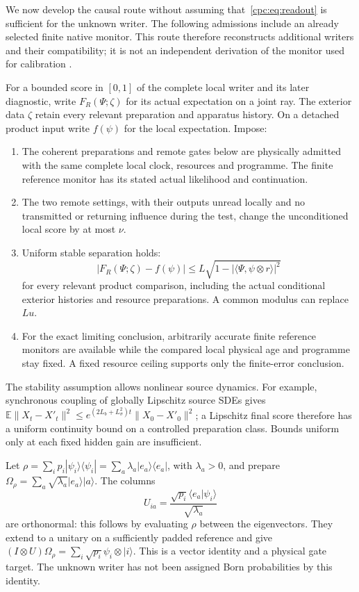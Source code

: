 \documentclass[11pt,oneside,openany]{book}
\theoremstyle{definition}
\theoremstyle{remark}\newtheorem{remark}[theorem]{Remark}
\begin{document}
We now develop the causal route without assuming that~\eqref{cpc:eq:readout} is sufficient for the unknown writer. The following admissions include an already selected finite native monitor. This route therefore reconstructs additional writers and their compatibility; it is not an independent derivation of the monitor used for calibration \cite{M09,M10}.

For a bounded score in $[0,1]$ of the complete local writer and its later diagnostic, write $F_R(\Psi;\zeta)$ for its actual expectation on a joint ray. The exterior data $\zeta$ retain every relevant preparation and apparatus history. On a detached product input write $f(\psi)$ for the local expectation. Impose:
\begin{enumerate}
\item The coherent preparations and remote gates below are physically admitted with the same complete local clock, resources and programme. The finite reference monitor has its stated actual likelihood and continuation.
\item The two remote settings, with their outputs unread locally and no transmitted or returning influence during the test, change the unconditioned local score by at most $\nu$.
\item Uniform stable separation holds:
\begin{equation}
 |F_R(\Psi;\zeta)-f(\psi)|\le L\sqrt{1-|\langle\Psi,\psi\otimes r\rangle|^2}
 \label{cpc:eq:stability}
\end{equation}
for every relevant product comparison, including the actual conditional exterior histories and resource preparations. A common modulus can replace $Lu$.
\item For the exact limiting conclusion, arbitrarily accurate finite reference monitors are available while the compared local physical age and programme stay fixed. A fixed resource ceiling supports only the finite-error conclusion.
\end{enumerate}
The stability assumption allows nonlinear source dynamics. For example, synchronous coupling of globally Lipschitz source SDEs gives
$\mathbb E\|X_t-X'_t\|^2\le e^{(2L_b+L_\sigma^2)t}\|X_0-X'_0\|^2$;
a Lipschitz final score therefore has a uniform continuity bound on a controlled preparation class. Bounds uniform only at each fixed hidden gain are insufficient.

Let $\rho=\sum_i p_i|\psi_i\rangle\langle\psi_i|=\sum_a\lambda_a|e_a\rangle\langle e_a|$, with $\lambda_a>0$, and prepare
$\Omega_\rho=\sum_a\sqrt{\lambda_a}|e_a\rangle|a\rangle$.
The columns
\begin{equation}
 U_{ia}=\frac{\sqrt{p_i}\langle e_a|\psi_i\rangle}{\sqrt{\lambda_a}}
 \label{cpc:eq:ensembleunitary}
\end{equation}
are orthonormal: this follows by evaluating $\rho$ between the eigenvectors. They extend to a unitary on a sufficiently padded reference and give
$(I\otimes U)\Omega_\rho=\sum_i\sqrt{p_i}\psi_i\otimes|i\rangle$.
This is a vector identity and a physical gate target. The unknown writer has not been assigned Born probabilities by this identity.
\end{document}
